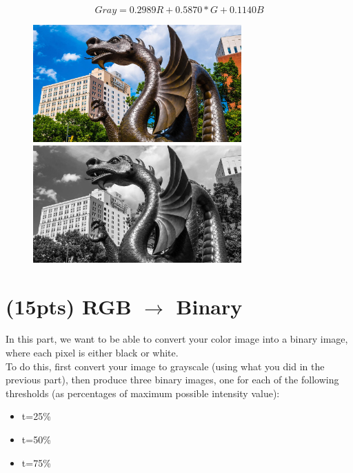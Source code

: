 \documentclass[12pt]{article}
\begin{document}
\begin{equation}
Gray=0.2989R+0.5870*G+0.1140B
\end{equation}

\begin{figure}[htp]
    \centering
    \includegraphics[width=8cm]{input_1.jpg}
    \includegraphics[width=8cm]{grayscale.jpg}
\end{figure}

\newpage
\section{(15pts) RGB $\rightarrow$ Binary}
In this part, we want to be able to convert your color image into a binary image, where each pixel is either black or white.\\

\noindent
To do this, first convert your image to grayscale (using what you did in the previous part), then produce three binary images, one for each of the following thresholds (as percentages of maximum possible intensity value):
\begin{itemize}
\item t=25\%
\item t=50\%
\item t=75\%
\end{itemize}
\end{document}
